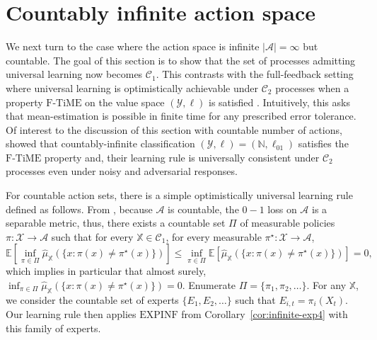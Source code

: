 \documentclass[aos]{imsart}
\theoremstyle{plain}
\theoremstyle{remark}
\newcommand{\ftime}{\text{F-TiME}}
\newcommand{\Acal}{\mathcal{A}}
\newcommand{\Ccal}{\mathcal{C}}
\newcommand{\Xcal}{\mathcal{X}}
\newcommand{\Ycal}{\mathcal{Y}}
\newcommand{\Ebb}{\mathbb{E}}
\newcommand{\Nbb}{\mathbb{N}}
\newcommand{\1}{\mathbbm{1}}%
\newcommand{\EXPINF}{\mathrm{EXPINF}}
\newcommand{\X}{\mathcal X}
\newcommand{\A}{\mathcal A}
\newcommand{\ProcX}{\mathbb{X}}
\newcommand{\goodpol}{\pi^{\star}}
\newcommand{\KC}{\mathcal{C}_{1}}
\begin{document}
\section{Countably infinite action space}
\label{sec:countable_actions}

We next turn to the case where the action space is infinite $|\Acal|=\infty$ but countable. The goal of this section is to show that the set of processes admitting universal learning now becomes $\Ccal_1$. This contrasts with the full-feedback setting where universal learning is optimistically achievable under $\Ccal_2$ processes when a property $\ftime$ on the value space $(\Ycal,\ell)$ is satisfied \cite{blanchard:22d}. Intuitively, this asks that mean-estimation is possible in finite time for any prescribed error tolerance. Of interest to the discussion of this section with countable number of actions, \cite{blanchard:22d} showed that countably-infinite classification $(\Ycal,\ell) = (\Nbb,\ell_{01})$ satisfies the $\ftime$ property and, their learning rule is universally consistent under $\Ccal_2$ processes even under noisy and adversarial responses.

For countable action sets, there is a simple optimistically universal learning rule defined as follows. From \citep*[Lemma 24]{hanneke:21}, because $\Acal$ is countable, the $0-1$ loss on $\Acal$ is a separable metric, thus, there exists a countable set $\Pi$ of measurable policies $\pi:\Xcal\to\Acal$ such that for every $\ProcX \in \KC$, 
for every measurable $\goodpol : \X \to \A$, 
\begin{equation*}
\Ebb\left[\inf_{\pi \in \Pi} \hat{\mu}_{\ProcX}( \{ x : \pi(x) \neq \goodpol(x) \} ) \right]\leq \inf_{\pi \in \Pi} \Ebb\left[\hat{\mu}_{\ProcX}( \{ x : \pi(x) \neq \goodpol(x) \} ) \right] = 0,
\end{equation*}
which implies in particular that almost surely, $\inf_{\pi \in \Pi} \hat{\mu}_{\ProcX}( \{ x : \pi(x) \neq \goodpol(x) \} )=0$.
Enumerate $\Pi = \{\pi_1,\pi_2,\ldots\}$.
For any $\ProcX$, we consider the countable set of experts $\{E_1,E_2,\ldots\}$
such that $E_{i,t} = \pi_i(X_t)$.
Our learning rule then applies $\EXPINF$ from Corollary~\ref{cor:infinite-exp4} with this family of experts.
\end{document}
